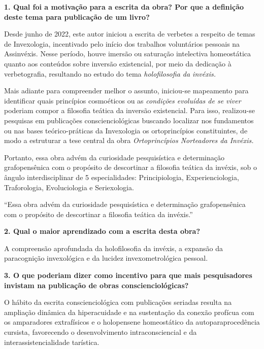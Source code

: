 \documentclass{gescons}
\begin{document}
    \begin{multicols}{2}



\textbf{1. Qual foi a motivação para a escrita da obra? Por que a definição deste tema para publicação de um livro?}

Desde junho de 2022, este autor iniciou a escrita de verbetes a respeito de temas de Invexologia, incentivado pelo início dos trabalhos voluntários pessoais na Assinvéxis. Nesse período, houve imersão ou saturação intelectiva homeostática quanto aos conteúdos sobre inversão existencial, por meio da dedicação à verbetografia, resultando no estudo do tema \textit{holofilosofia da invéxis.}

Mais adiante para compreender melhor o assunto, iniciou-se mapeamento para identificar quais princípios cosmoéticos ou as \textit{condições evoluídas de se viver} poderiam compor a filosofia teática da inversão existencial. Para isso, realizou-se pesquisas em publicações conscienciológicas buscando localizar nos fundamentos ou nas bases teórico-práticas da Invexologia os ortoprincípios constituintes, de modo a estruturar a tese central da obra \textit{Ortoprincípios Norteadores da Invéxis.}

Portanto, essa obra advém da curiosidade pesquisística e determinação grafopensênica com o propósito de descortinar a filosofia teática da invéxis, sob 
o ângulo interdisciplinar de 5 especialidades: Principiologia, Experienciologia, Traforologia, Evoluciologia e Seriexologia.

\begin{pullquote}
``Essa obra advém da curiosidade pesquisística e determinação grafopensênica com o propósito de descortinar a filosofia teática da invéxis.''    
\end{pullquote}




\textbf{2. Qual o maior aprendizado com a escrita desta obra?}

A compreensão aprofundada da holofilosofia da invéxis, a expansão da paracognição invexológica e da lucidez invexometrológica pessoal.

\textbf{3. O que poderiam dizer como incentivo para que mais pesquisadores invistam na publicação de obras conscienciológicas?}

O hábito da escrita conscienciológica com publicações seriadas resulta na ampliação dinâmica da hiperacuidade e na sustentação da conexão profícua com os amparadores extrafísicos e o holopensene homeostático da autoparaprocedência cursista, favorecendo o desenvolvimento intraconsciencial e da interassistencialidade tarística.


    
    
    \end{multicols}
\end{document}
